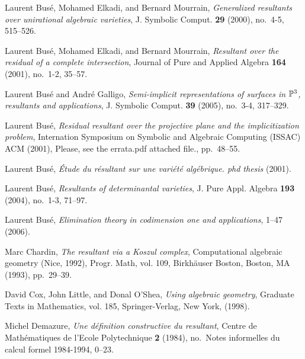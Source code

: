 \documentclass[10pt]{amsart}
\theoremstyle{plain}
\theoremstyle{definition}
\begin{document}
\def\cprime{$'$}
\providecommand{\bysame}{\leavevmode\hbox to3em{\hrulefill}\thinspace}
\providecommand{\MR}{\relax\ifhmode\unskip\space\fi MR }
\providecommand{\MRhref}[2]{%
  \href{http://www.ams.org/mathscinet-getitem?mr=#1}{#2}
}
\providecommand{\href}[2]{#2}
\begin{thebibliography}{BEM01}

Laurent Bus{\'e}, Mohamed Elkadi, and Bernard Mourrain, \emph{Generalized
  resultants over unirational algebraic varieties}, J. Symbolic Comput.
  \textbf{29} (2000), no.~4-5, 515--526.
  
Laurent Bus{\'e}, Mohamed Elkadi, and Bernard Mourrain, \emph{{Resultant over the residual of a complete intersection}},
  Journal of Pure and Applied Algebra \textbf{164} (2001), no.~1-2, 35--57.

Laurent Bus{\'e} and Andr{\'e} Galligo, \emph{Semi-implicit representations of
  surfaces in {$\Bbb P^3$}, resultants and applications}, J. Symbolic Comput.
  \textbf{39} (2005), no.~3-4, 317--329.
  
Laurent Bus{\'e}, \emph{{Residual resultant over the projective plane and the
  implicitization problem}}, {Internation Symposium on Symbolic and Algebraic
  Computing (ISSAC)} ACM (2001), Please, see the
  errata.pdf attached file., pp.~48--55.

Laurent Bus{\'e}, \emph{{\'E}tude du r{\'e}sultant sur une vari{\'e}t{\'e}
  alg{\'e}brique. phd thesis} (2001).

Laurent Bus{\'e}, \emph{Resultants of determinantal varieties}, J. Pure Appl.
  Algebra \textbf{193} (2004), no.~1-3, 71--97.
  
Laurent Bus{\'e}, \emph{Elimination theory in codimension one and
  applications}, 1--47  (2006).

Marc Chardin, \emph{The resultant via a {K}oszul complex}, Computational
  algebraic geometry (Nice, 1992), Progr. Math, vol. 109, Birkh{\"a}user
  Boston, Boston, MA (1993), pp.~29--39.

David Cox, John Little, and Donal O'Shea, \emph{Using algebraic geometry},
  Graduate Texts in Mathematics, vol. 185, Springer-Verlag, New York, (1998).

Michel Demazure, \emph{Une d\'efinition constructive du resultant}, Centre de
  Math\'ematiques de l'{E}cole {P}olytechnique \textbf{2} (1984), no.~Notes
  informelles du calcul formel 1984-1994, 0--23.


\end{thebibliography}
\end{document}
